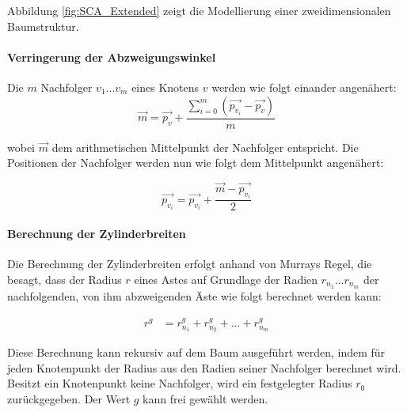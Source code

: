 Abbildung \ref{fig:SCA_Extended} zeigt die Modellierung einer zweidimensionalen Baumstruktur.

\paragraph{Verringerung der Abzweigungswinkel} \label{par:VerringerungAbzweigungswinkel}

Die $m$ Nachfolger $v_{1} ... v_{m}$ eines Knotens $v$ werden wie folgt einander angenähert:
\begin{equation}
\overrightarrow{m} = \overrightarrow{p_v} + \dfrac{\sum_{i=0}^{m} (\overrightarrow{p_{v_i}} - \overrightarrow{p_v})}{m}
\end{equation}

wobei $\overrightarrow{m}$ dem arithmetischen Mittelpunkt der Nachfolger entspricht. Die Positionen der Nachfolger werden nun wie folgt dem Mittelpunkt angenähert:

\begin{equation}
\overrightarrow{p_{v_i}} = \overrightarrow{p_{v_i}} + \dfrac{\overrightarrow{m} -\overrightarrow{p_{v_i}}}{2}
\end{equation}


\paragraph{Berechnung der Zylinderbreiten}

Die Berechnung der Zylinderbreiten erfolgt anhand von Murrays Regel, die besagt, dass der Radius $r$ eines Astes auf Grundlage der Radien $r_{n_1}...r_{n_m}$ der nachfolgenden, von ihm abzweigenden Äste wie folgt berechnet werden kann: 

\begin{equation}
\begin{array}{ll}
r^g & = r_{n_1}^g + r_{n_2}^g + ... + r_{n_m}^g 
\end{array}
\label{eq:Radiusberechnung}
\end{equation} 

Diese Berechnung kann rekursiv auf dem Baum ausgeführt werden, indem für jeden Knotenpunkt der Radius aus den Radien seiner Nachfolger berechnet wird. Besitzt ein Knotenpunkt keine Nachfolger, wird ein festgelegter Radius $r_0$ zurückgegeben. \cite[Abschn. 3.5]{LeafVenation:05} Der Wert $g$ kann frei gewählt werden.

